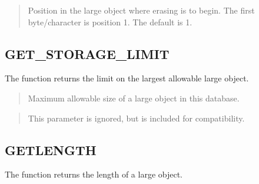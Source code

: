 \documentclass[letterpaper,10pt,english,openany,oneside]{sphinxmanual}
\begin{document}
\begin{quote}

Position in the large object where erasing is to begin. The first
byte/character is position 1. The default is 1.
\end{quote}

\newpage


\subsection{GET\_STORAGE\_LIMIT}
\label{\detokenize{get_storage_limit:get-storage-limit}}\label{\detokenize{get_storage_limit::doc}}
The  function returns the limit on the largest
allowable large object.
\begin{quote}


\end{quote}


\begin{quote}

Maximum allowable size of a large object in this database.
\end{quote}

\begin{quote}

This parameter is ignored, but is included for compatibility.
\end{quote}

\newpage


\subsection{GETLENGTH}
\label{\detokenize{getlength::doc}}\label{\detokenize{getlength:getlength}}
The  function returns the length of a large object.
\begin{quote}


\end{quote}
\end{document}
